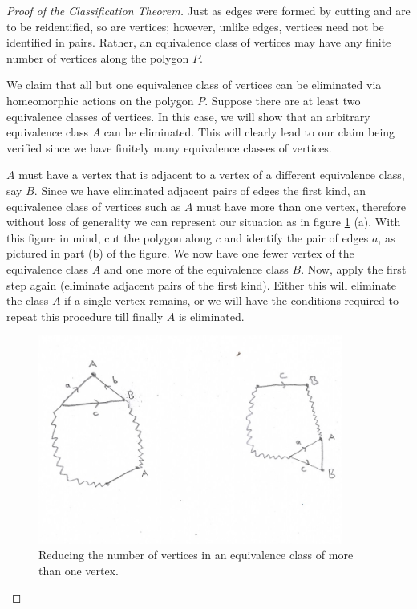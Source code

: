 \begin{proof}[Proof of the Classification Theorem]
    Just as edges were formed by cutting and are to be reidentified, so
    are vertices; however, unlike edges, vertices need not be identified
    in pairs. Rather, an equivalence class of vertices may have any
    finite number of vertices along the polygon $P$. 
    
    We claim that all but one equivalence class of vertices can be
    eliminated via homeomorphic actions on the polygon $P$. Suppose
    there are at least two equivalence classes of vertices. In this
    case, we will show that an arbitrary equivalence class $A$ can be
    eliminated. This will clearly lead to our claim being verified
    since we have finitely many equivalence classes of vertices.

    $A$ must have a vertex that is adjacent to a vertex of a different
    equivalence class, say $B$. Since we have eliminated adjacent
    pairs of edges the first kind, an equivalence class of vertices
    such as $A$ must have more than one vertex, therefore without loss
    of generality we can represent our situation as in figure
    \ref{fig:vertex-eliminate} (a). With this figure in mind, 
    cut the polygon along $c$ and identify the pair of edges $a$, as
    pictured in part (b) of the figure. We now have one fewer vertex
    of the equivalence class $A$ and one more of the equivalence class
    $B$. Now, apply the first step again (eliminate adjacent pairs of
    the first kind). Either this will eliminate the class $A$ if a
    single vertex remains, or we will have the conditions required to
    repeat this procedure till finally $A$ is eliminated.
    
    \begin{figure}[htbp]
     \centering
     \includegraphics[width=10cm]{vertex.png}
     \caption{Reducing the number of vertices in an equivalence class
       of more than one vertex.}
     \label{fig:vertex-eliminate}
   \end{figure}


\end{proof}
